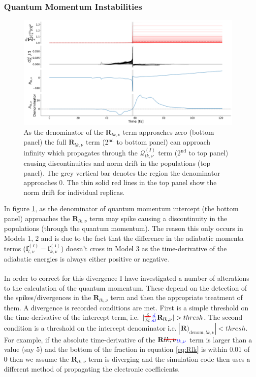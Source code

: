 \subsubsection{Quantum Momentum Instabilities}
\label{sect:QlkSpikes}
\begin{figure}[ht]
	\includegraphics[width=\textwidth]{../img/CTMQC/TullyModels/Spikes/RlkDenom_Rlk_Qlk_Norm.png}
	\caption{\label{fig:QlkSpike}As the denominator of the $\mathbf{R}_{lk,\nu}$ term approaches zero (bottom panel) the full $\mathbf{R}_{lk, \nu}$ term (2$^{\text{nd}}$ to bottom panel) can approach infinity which propagates through the $\mathcal{Q}_{lk, \nu}^{(I)}$ term (2$^{\text{nd}}$ to top panel) causing discontinuities and norm drift in the populations (top panel). The grey vertical bar denotes the region the denominator approaches 0. The thin solid red lines in the top panel show the norm drift for individual replicas.}
\end{figure}
\noindent In figure \ref{fig:QlkSpike}, as the denominator of quantum momentum intercept (the bottom panel) approaches  the $\mathbf{R}_{lk, \nu}$ term may spike causing a discontinuity in the populations (through the quantum momentum). The reason this only occurs in Models 1, 2 and  is due to the fact that the difference in the adiabatic momenta terms ($\mathbf{f}_{l, \nu}^{(I)} - \mathbf{f}_{k, \nu}^{(I)}$) doesn't cross  in Model 3 as the time-derivative of the adiabatic energies is always either positive or negative.
\\\\
In order to correct for this divergence I have investigated a number of alterations to the calculation of the quantum momentum. These depend on the detection of the spikes/divergences in the $\mathbf{R}_{lk, \nu}$ term and then the appropriate treatment of them. A divergence is recorded  conditions are met. First is a simple threshold on the time-derivative of the intercept term, i.e. $|\mremove{\frac{\delta}{\delta t}}\madd{\frac{d}{dt}} \mathbf{R}_{lk, \nu}| > thresh$. The second condition is a threshold on the intercept denominator i.e. $|\mathbf{R})_{\text{denom}, lk, \nu}| < thresh$. For example, if the absolute time-derivative of the $\mathbf{R}\mremove{{lk, \nu}}\madd{_{lk, \nu}}$ term is larger than a value (say 5) and the bottom of the fraction in equation \eqref{eq:Rlk} is within 0.01 of 0 then we assume the $\mathbf{R}_{lk, \nu}$ term is diverging and the simulation code then uses a different method of propagating the electronic coefficients.
